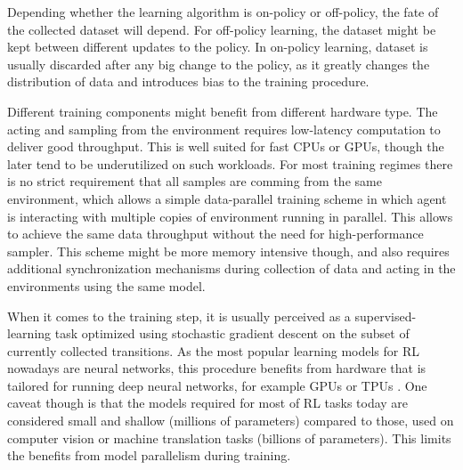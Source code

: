 Depending whether the learning algorithm is on-policy or off-policy, the fate of the collected
dataset will depend. For off-policy learning, the dataset might be kept between different updates
to the policy. In on-policy learning, dataset is usually discarded after any big change to the
policy, as it greatly changes the distribution of data and introduces bias to the training
procedure.

Different training components might benefit from different hardware type. The acting and sampling
from the environment requires low-latency computation to deliver good throughput. This is well
suited for fast CPUs or GPUs, though the later tend to be underutilized on such workloads.
For most training regimes there is no strict requirement that all samples are comming from the
same environment, which allows a simple data-parallel training scheme in which agent is interacting
with multiple copies of environment running in parallel. This allows to achieve the same data
throughput without the need for high-performance sampler. This scheme might be more memory intensive
though, and also requires additional synchronization mechanisms during collection of data
and acting in the environments using the same model.

When it comes to the training step, it is usually perceived as a supervised-learning task
optimized using stochastic gradient descent on the subset of currently collected transitions.
As the most popular learning models for RL nowadays are neural networks, this procedure
benefits from hardware that is tailored for running deep neural networks, for example GPUs
or TPUs \cite{jouppi2017datacenter}. One caveat though is that the models required for most of RL tasks today
are considered small and shallow (millions of parameters) compared to those, used on
computer vision or machine translation tasks (billions of parameters). This limits the benefits
from model parallelism during training.

